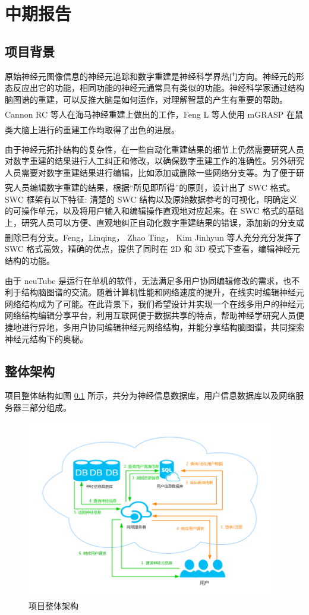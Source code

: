 \newcommand{\upcite}[1]{\textsuperscript{\textsuperscript{\cite{#1}}}}
\chapter*{\zjutitlec 中期报告}

\section{项目背景}
原始神经元图像信息的神经元追踪和数字重建是神经科学界热门方向。神经元的形态反应出它的功能，相同功能的神经元通常具有类似的功能。神经科学家通过结构脑图谱的重建，可以反推大脑是如何运作，对理解智慧的产生有重要的帮助。Cannon RC 等人在海马神经重建上做出的工作\upcite{Cannon1998An}，Feng L 等人使用 mGRASP 在鼠类大脑上进行的重建工作\upcite{Druckmann2014Structured}均取得了出色的进展。

由于神经元拓扑结构的复杂性，在一些自动化重建结果的细节上仍然需要研究人员对数字重建的结果进行人工纠正和修改，以确保数字重建工作的准确性。另外研究人员需要对数字重建结果进行编辑，比如添加或删除一些网络分支等。为了便于研究人员编辑数字重建的结果，根据“所见即所得”的原则，设计出了 SWC 格式\upcite{Peng2011Proof}。SWC 框架有以下特征: 清楚的 SWC 结构以及原始数据参考的可视化，明确定义的可操作单元，以及将用户输入和编辑操作直观地对应起来。在 SWC 格式的基础上，研究人员可以方便、直观地纠正自动化数字重建结果的错误，添加新的分支或删除已有分支。Feng，Linqing， Zhao Ting， Kim Jinhyun 等人\upcite{Feng2014neuTube}充分充分发挥了 SWC 格式高效，精确的优点，提供了同时在 2D 和 3D 模式下查看，编辑神经元结构的功能。

由于 neuTube 是运行在单机的软件，无法满足多用户协同编辑修改的需求，也不利于结构脑图谱的交流。随着计算机性能和网络速度的提升，在线实时编辑神经元网络结构成为了可能。在此背景下，我们希望设计并实现一个在线多用户的神经元网络结构编辑分享平台，利用互联网便于数据共享的特点，帮助神经学研究人员便捷地进行异地，多用户协同编辑神经元网络结构，并能分享结构脑图谱，共同探索神经元结构下的奥秘。

\section{整体架构}
项目整体结构如图 \ref{server} 所示，共分为神经信息数据库，用户信息数据库以及网络服务器三部分组成。
\begin{figure}
\centering
\includegraphics[width=108mm]{images/server}
\caption{项目整体架构}
\label{server}
\end{figure}

